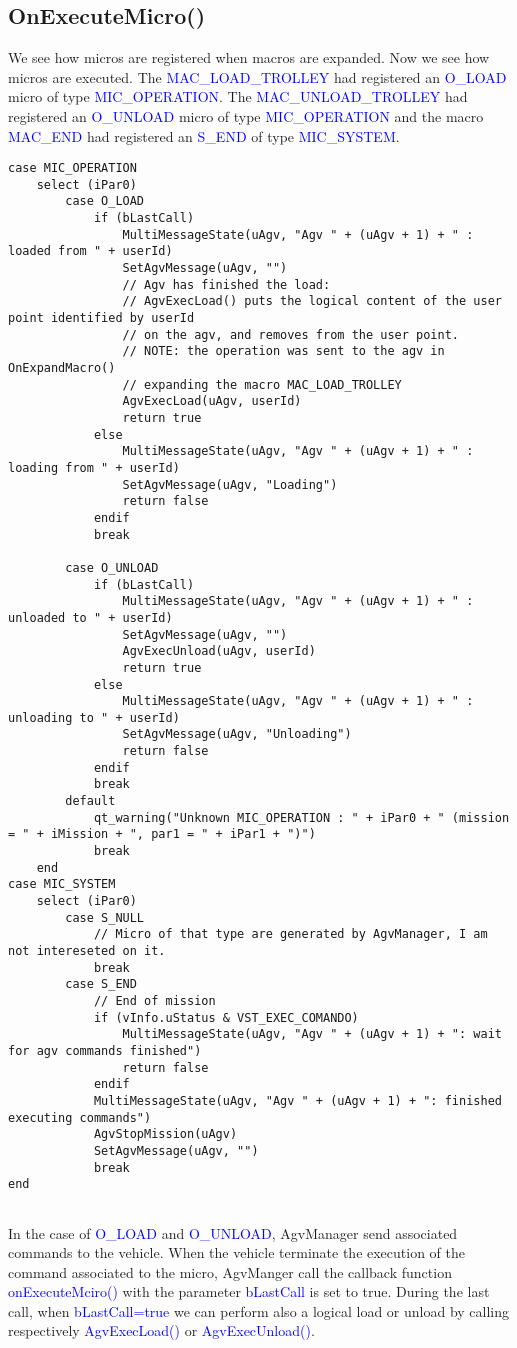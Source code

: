 \subsection*{OnExecuteMicro()}
We see how micros are registered when macros are expanded. Now we see how micros are executed.
The \textcolor{blue}{MAC\_LOAD\_TROLLEY} had registered an \textcolor{blue}{O\_LOAD} micro of type \textcolor{blue}{MIC\_OPERATION}.
The \textcolor{blue}{MAC\_UNLOAD\_TROLLEY} had registered an \textcolor{blue}{O\_UNLOAD} micro of type \textcolor{blue}{MIC\_OPERATION} and the macro \textcolor{blue}{MAC\_END} had registered an \textcolor{blue}{S\_END} of type \textcolor{blue}{MIC\_SYSTEM}.

\begin{lstlisting}
case MIC_OPERATION
	select (iPar0)
		case O_LOAD
			if (bLastCall)
				MultiMessageState(uAgv, "Agv " + (uAgv + 1) + " : loaded from " + userId)
				SetAgvMessage(uAgv, "")
				// Agv has finished the load:
				// AgvExecLoad() puts the logical content of the user point identified by userId
				// on the agv, and removes from the user point.
				// NOTE: the operation was sent to the agv in OnExpandMacro()
				// expanding the macro MAC_LOAD_TROLLEY
				AgvExecLoad(uAgv, userId)
				return true
			else
				MultiMessageState(uAgv, "Agv " + (uAgv + 1) + " : loading from " + userId)
				SetAgvMessage(uAgv, "Loading")
				return false
			endif
			break
	
		case O_UNLOAD
			if (bLastCall)
				MultiMessageState(uAgv, "Agv " + (uAgv + 1) + " : unloaded to " + userId)
				SetAgvMessage(uAgv, "")
				AgvExecUnload(uAgv, userId)
				return true
			else
				MultiMessageState(uAgv, "Agv " + (uAgv + 1) + " : unloading to " + userId)
				SetAgvMessage(uAgv, "Unloading")
				return false
			endif
			break
		default
			qt_warning("Unknown MIC_OPERATION : " + iPar0 + " (mission = " + iMission + ", par1 = " + iPar1 + ")")
			break
	end
case MIC_SYSTEM
	select (iPar0)
		case S_NULL
			// Micro of that type are generated by AgvManager, I am not intereseted on it.
			break
		case S_END
			// End of mission
			if (vInfo.uStatus & VST_EXEC_COMANDO)
				MultiMessageState(uAgv, "Agv " + (uAgv + 1) + ": wait for agv commands finished")
				return false
			endif
			MultiMessageState(uAgv, "Agv " + (uAgv + 1) + ": finished executing commands")
			AgvStopMission(uAgv)
			SetAgvMessage(uAgv, "")
			break
end
	
\end{lstlisting}

In the case of \textcolor{blue}{O\_LOAD} and \textcolor{blue}{O\_UNLOAD}, AgvManager send associated commands to the vehicle. When the vehicle terminate the execution of the command associated to the micro, AgvManger call the callback function \textcolor{blue}{onExecuteMciro()} with the parameter \textcolor{blue}{bLastCall} is set to true. During the last call, when \textcolor{blue}{bLastCall=true} we can perform also a logical load or unload by calling respectively \textcolor{blue}{AgvExecLoad()} or \textcolor{blue}{AgvExecUnload()}.

